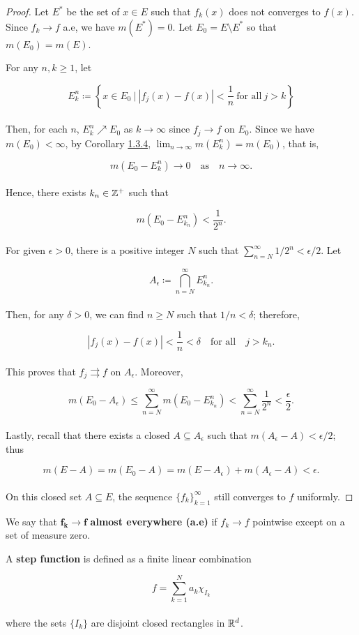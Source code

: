 \documentclass[12pt, a4paper, openany, twoside]{book}
\theoremstyle{definition}
\theoremstyle{remark}
\theoremstyle{plain}
\numberwithin{equation}{section}
\begin{document}
\begin{proof}
    Let $E^*$ be the set of $x\in E$ such that $f_k(x)$ does not converges to $f(x)$. Since $f_k\rightarrow f$ a.e, we have $m(E^*)=0$. Let $E_0=E\setminus E^*$ so that $m(E_0)=m(E)$.

    For any $n, k\geq 1$, let 

    \[E_k^n\coloneqq\left\{x\in E_0\ \Big|\ |f_j(x)-f(x)|<\frac{1}{n}\ \text{for all}\ j>k\right\}\]
    \\
    Then, for each $n$, $E_k^n\nearrow E_0$ as $k\rightarrow\infty$ since $f_j\rightarrow f$ on $E_0$. Since we have $m(E_0)<\infty$, by Corollary \hyperref[Corollary 1.3.4]{1.3.4}, $\lim_{n\rightarrow\infty}{m(E_k^n)}=m(E_0)$, that is, 

    \[m(E_0-E_k^n)\rightarrow 0\quad\text{as}\quad n\rightarrow\infty.\]
    \\
    Hence, there exists $k_n\in{\mathbb {Z}}^+$ such that 
    
    \[m(E_0-E_{k_n}^n)<\frac{1}{2^n}.\]
    \\
    For given $\epsilon>0$, there is a positive integer $N$ such that $\sum_{n=N}^{\infty}{1/2^n}<\epsilon/2$. Let 

    \[A_\epsilon\coloneqq\bigcap_{n=N}^{\infty}{E_{k_n}^n}.\]
    \\
    Then, for any $\delta>0$, we can find $n\geq N$ such that $1/n<\delta$; therefore, 

    \[|f_j(x)-f(x)|<\frac{1}{n}<\delta\quad\text{for all}\quad j>k_n.\]
    \\
    This proves that $f_j\rightrightarrows f$ on $A_\epsilon$. Moreover, 

    \[m(E_0-A_\epsilon)\leq \sum_{n=N}^{\infty}{m(E_0-E_{k_n}^n)}<\sum_{n=N}^{\infty}{\frac{1}{2^n}}<\frac{\epsilon}{2}.\]
    \\
    \indent Lastly, recall that there exists a closed $A\subseteq A_\epsilon$ such that $m(A_\epsilon-A)<\epsilon/2$; thus
    
    \[m(E-A)=m(E_0-A)= m(E-A_\epsilon)+m(A_\epsilon-A)<\epsilon.\]
    \\
    On this closed set $A\subseteq E$, the sequence $\{f_k\}_{k=1}^{\infty}$ still converges to $f$ uniformly. 
\end{proof}
\vspace{5mm}
\begin{tcolorbox}[colback=yellow!10!white,colframe=blue!75!black,title=Definition 1.4.5]\label{Definition 1.4.5}
    We say that $\boldsymbol{f_k\rightarrow f}$ \textbf{almost everywhere (a.e)} if $f_k\rightarrow f$ pointwise except on a set of measure zero.
\end{tcolorbox}
\vspace{5mm}
\begin{tcolorbox}[colback=yellow!10!white,colframe=blue!75!black,title=Definition 1.4.6]\label{Definition 1.4.6}
    A \textbf{step function} is defined as a finite linear combination

    \[f=\sum_{k=1}^{N}{a_k\chi_{I_k}}\]
    \\
    where the sets $\{I_k\}$ are disjoint closed rectangles in ${\mathbb {R}}^d$.
\end{tcolorbox}
\vspace{5mm}
\end{document}
